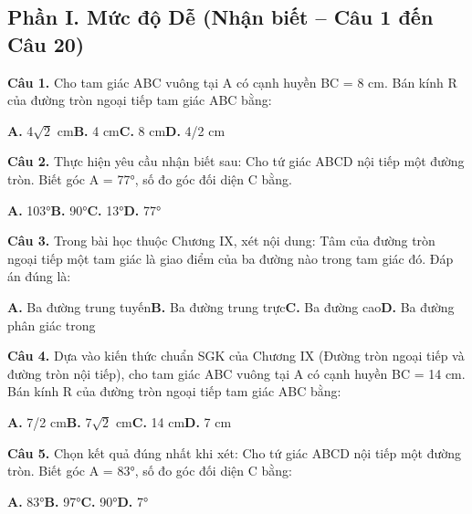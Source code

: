 \documentclass[11pt,a4paper]{article}
\begin{document}
\subsection*{\color{accent} Phần I. Mức độ Dễ (Nhận biết -- Câu 1 đến Câu 20)}
\textbf{\color{primary} Câu 1.} Cho tam giác ABC vuông tại A có cạnh huyền BC = 8 cm. Bán kính R của đường tròn ngoại tiếp tam giác ABC bằng:\par
\hspace*{1.5em}\textbf{A.} 4$\sqrt{2}$ cm\quad\quad \textbf{B.} 4 cm\quad\quad \textbf{C.} 8 cm\quad\quad \textbf{D.} 4/2 cm\par\vspace{2pt}
\textbf{\color{primary} Câu 2.} Thực hiện yêu cầu nhận biết sau: Cho tứ giác ABCD nội tiếp một đường tròn. Biết góc A = 77°, số đo góc đối diện C bằng.\par
\hspace*{1.5em}\textbf{A.} 103°\quad\quad \textbf{B.} 90°\quad\quad \textbf{C.} 13°\quad\quad \textbf{D.} 77°\par\vspace{2pt}
\textbf{\color{primary} Câu 3.} Trong bài học thuộc Chương IX, xét nội dung: Tâm của đường tròn ngoại tiếp một tam giác là giao điểm của ba đường nào trong tam giác đó. Đáp án đúng là:\par
\hspace*{1.5em}\textbf{A.} Ba đường trung tuyến\quad\quad \textbf{B.} Ba đường trung trực\quad\quad \textbf{C.} Ba đường cao\quad\quad \textbf{D.} Ba đường phân giác trong\par\vspace{2pt}
\textbf{\color{primary} Câu 4.} Dựa vào kiến thức chuẩn SGK của Chương IX (Đường tròn ngoại tiếp và đường tròn nội tiếp), cho tam giác ABC vuông tại A có cạnh huyền BC = 14 cm. Bán kính R của đường tròn ngoại tiếp tam giác ABC bằng:\par
\hspace*{1.5em}\textbf{A.} 7/2 cm\quad\quad \textbf{B.} 7$\sqrt{2}$ cm\quad\quad \textbf{C.} 14 cm\quad\quad \textbf{D.} 7 cm\par\vspace{2pt}
\textbf{\color{primary} Câu 5.} Chọn kết quả đúng nhất khi xét: Cho tứ giác ABCD nội tiếp một đường tròn. Biết góc A = 83°, số đo góc đối diện C bằng:\par
\hspace*{1.5em}\textbf{A.} 83°\quad\quad \textbf{B.} 97°\quad\quad \textbf{C.} 90°\quad\quad \textbf{D.} 7°\par\vspace{2pt}
\end{document}
